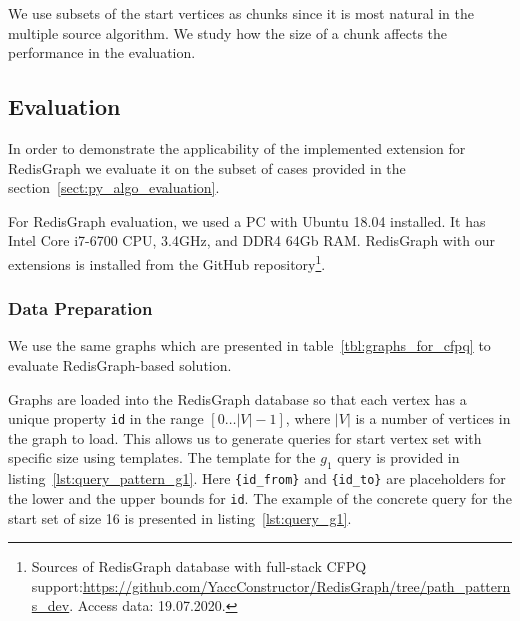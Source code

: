 We use subsets of the start vertices as chunks since it is most natural in the multiple source algorithm.
We study how the size of a chunk affects the performance in the evaluation.

\subsection{Evaluation}

In order to demonstrate the applicability of the implemented extension for RedisGraph we evaluate it on the subset of cases provided in the section~\ref{sect:py_algo_evaluation}.

For RedisGraph evaluation, we used a PC with Ubuntu 18.04 installed.
It has Intel Core i7-6700 CPU, 3.4GHz, and DDR4 64Gb RAM.
RedisGraph with our extensions is installed from the GitHub repository\footnote{Sources of RedisGraph database with full-stack CFPQ support:\url{https://github.com/YaccConstructor/RedisGraph/tree/path_patterns_dev}. Access data: 19.07.2020.}.

\subsubsection{Data Preparation}

We use the same graphs which are presented in table~\ref{tbl:graphs_for_cfpq} to evaluate RedisGraph-based solution.

Graphs are loaded into the RedisGraph database so that each vertex has a unique property \verb|id| in the range $[0 \ldots |V|-1]$, where $|V|$ is a number of vertices in the graph to load.
This allows us to generate queries for start vertex set with specific size using templates.
The template for the $g_1$ query is provided in listing~\ref{lst:query_pattern_g1}.
Here \texttt{\{id\_from\}} and \texttt{\{id\_to\}} are placeholders for the lower and the upper bounds for \verb|id|.
The example of the concrete query for the start set of size 16 is presented in listing~\ref{lst:query_g1}.

\begin{algorithm}
\end{algorithm}

